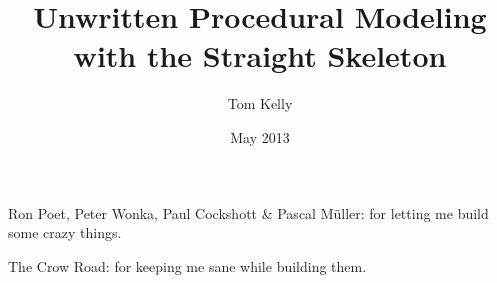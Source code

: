 \documentclass[oneside]{glasgowthesis}
\begin{document}
\pagestyle{empty}

\title{Unwritten Procedural Modeling with the Straight Skeleton}
\author{Tom Kelly}
\date{May 2013}

\maketitle

\newpage

 

% 

\newpage
\vspace*{1.75in}

\begin{flushright}
Ron Poet, Peter Wonka, Paul Cockshott \& Pascal M\"{u}ller:\newline
for letting me build some crazy things. 
\end{flushright}
\begin{flushright}
The Crow Road:\newline
for keeping me sane while building them.
\end{flushright}








\tableofcontents
\listoffigures

\newpage
\pagestyle{fancy}
\setcounter{page}{1}
\end{document}
